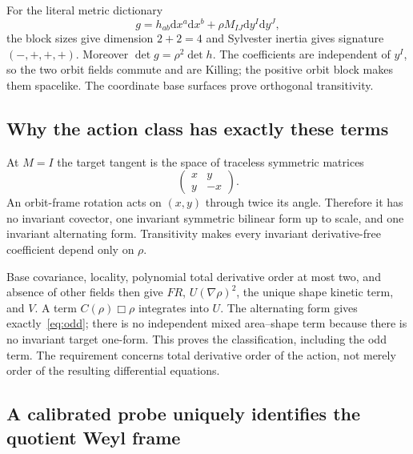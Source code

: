 \documentclass[11pt]{article}
\newcommand{\dd}{\mathrm d}
\begin{document}
For the literal metric dictionary
\begin{equation}\label{eq:g}
 g=h_{ab}\dd x^a\dd x^b+\rho M_{IJ}\dd y^I\dd y^J,
\end{equation}
the block sizes give dimension $2+2=4$ and Sylvester inertia gives signature $(-,+,+,+)$. Moreover $\det g=\rho^2\det h$. The coefficients are independent of $y^I$, so the two orbit fields commute and are Killing; the positive orbit block makes them spacelike. The coordinate base surfaces prove orthogonal transitivity.

\subsection{Why the action class has exactly these terms}

At $M=I$ the target tangent is the space of traceless symmetric matrices
\begin{equation}
 \begin{pmatrix}x&y\\y&-x\end{pmatrix}.
\end{equation}
An orbit-frame rotation acts on $(x,y)$ through twice its angle. Therefore it has no invariant covector, one invariant symmetric bilinear form up to scale, and one invariant alternating form. Transitivity makes every invariant derivative-free coefficient depend only on $\rho$.

Base covariance, locality, polynomial total derivative order at most two, and absence of other fields then give $F R$, $U(\nabla\rho)^2$, the unique shape kinetic term, and $V$. A term $C(\rho)\Box\rho$ integrates into $U$. The alternating form gives exactly~\eqref{eq:odd}; there is no independent mixed area--shape term because there is no invariant target one-form. This proves the classification, including the odd term. The requirement concerns total derivative order of the action, not merely order of the resulting differential equations.

\subsection{A calibrated probe uniquely identifies the quotient Weyl frame}\label{sec:frame}
\end{document}
